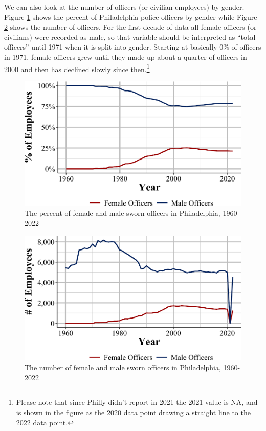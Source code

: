 \documentclass[
  12pt,
  openany]{book}
\begin{document}
We can also look at the number of officers (or civilian employees) by gender. Figure \ref{fig:leokaOfficersGender} shows the percent of Philadelphia police officers by gender while Figure \ref{fig:leokaOfficersGenderCount} shows the number of officers. For the first decade of data all female officers (or civilians) were recorded as male, so that variable should be interpreted as ``total officers'' until 1971 when it is split into gender. Starting at basically 0\% of officers in 1971, female officers grew until they made up about a quarter of officers in 2000 and then has declined slowly since then.\footnote{Please note that since Philly didn't report in 2021 the 2021 value is NA, and is shown in the figure as the 2020 data point drawing a straight line to the 2022 data point.}

\begin{figure}

{\centering \includegraphics[width=0.9\linewidth]{07_leoka_files/figure-latex/leokaOfficersGender-1} 

}

\caption{The percent of female and male sworn officers in Philadelphia, 1960-2022}\label{fig:leokaOfficersGender}
\end{figure}

\begin{figure}

{\centering \includegraphics[width=0.9\linewidth]{07_leoka_files/figure-latex/leokaOfficersGenderCount-1} 

}

\caption{The number of female and male sworn officers in Philadelphia, 1960-2022}\label{fig:leokaOfficersGenderCount}
\end{figure}
\end{document}
